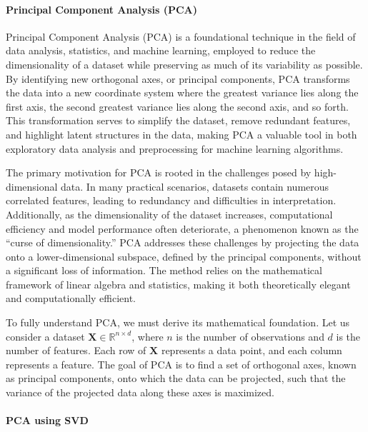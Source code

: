 \documentclass{article}
\begin{document}
    \paragraph{Principal Component Analysis
(PCA)}\label{principal-component-analysis-pca}

Principal Component Analysis (PCA) is a foundational technique in the
field of data analysis, statistics, and machine learning, employed to
reduce the dimensionality of a dataset while preserving as much of its
variability as possible. By identifying new orthogonal axes, or
principal components, PCA transforms the data into a new coordinate
system where the greatest variance lies along the first axis, the second
greatest variance lies along the second axis, and so forth. This
transformation serves to simplify the dataset, remove redundant
features, and highlight latent structures in the data, making PCA a
valuable tool in both exploratory data analysis and preprocessing for
machine learning algorithms.

The primary motivation for PCA is rooted in the challenges posed by
high-dimensional data. In many practical scenarios, datasets contain
numerous correlated features, leading to redundancy and difficulties in
interpretation. Additionally, as the dimensionality of the dataset
increases, computational efficiency and model performance often
deteriorate, a phenomenon known as the ``curse of dimensionality.'' PCA
addresses these challenges by projecting the data onto a
lower-dimensional subspace, defined by the principal components, without
a significant loss of information. The method relies on the mathematical
framework of linear algebra and statistics, making it both theoretically
elegant and computationally efficient.

To fully understand PCA, we must derive its mathematical foundation. Let
us consider a dataset \(\mathbf{X} \in \mathbb{R}^{n \times d}\), where
\(n\) is the number of observations and \(d\) is the number of features.
Each row of \(\mathbf{X}\) represents a data point, and each column
represents a feature. The goal of PCA is to find a set of orthogonal
axes, known as principal components, onto which the data can be
projected, such that the variance of the projected data along these axes
is maximized.

    \paragraph{PCA using SVD}\label{pca-using-svd}
\end{document}
